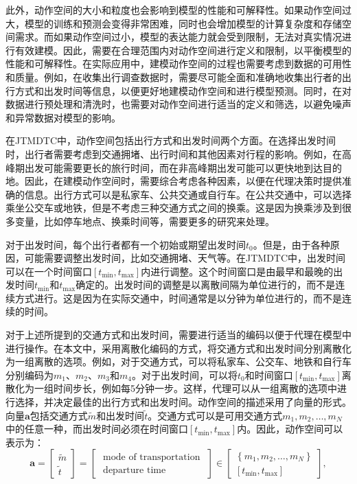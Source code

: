 此外，动作空间的大小和粒度也会影响到模型的性能和可解释性。如果动作空间过大，模型的训练和预测会变得非常困难，同时也会增加模型的计算复杂度和存储空间需求。而如果动作空间过小，模型的表达能力就会受到限制，无法对真实情况进行有效建模。因此，需要在合理范围内对动作空间进行定义和限制，以平衡模型的性能和可解释性。在实际应用中，建模动作空间的过程也需要考虑到数据的可用性和质量。例如，在收集出行调查数据时，需要尽可能全面和准确地收集出行者的出行方式和出发时间等信息，以便更好地建模动作空间和进行模型预测。同时，在对数据进行预处理和清洗时，也需要对动作空间进行适当的定义和筛选，以避免噪声和异常数据对模型的影响。

在JTMDTC中，动作空间包括出行方式和出发时间两个方面。在选择出发时间时，出行者需要考虑到交通拥堵、出行时间和其他因素对行程的影响。例如，在高峰期出发可能需要更长的旅行时间，而在非高峰期出发可能可以更快地到达目的地。因此，在建模动作空间时，需要综合考虑各种因素，以便在代理决策时提供准确的信息。出行方式可以是私家车、公共交通或自行车。在公共交通中，可以选择乘坐公交车或地铁，但是不考虑三种交通方式之间的换乘。这是因为换乘涉及到很多变量，比如停车地点、换乘时间等，需要更多的研究来处理。

对于出发时间，每个出行者都有一个初始或期望出发时间$t_0$。但是，由于各种原因，可能需要调整出发时间，比如交通拥堵、天气等。在JTMDTC中，出发时间可以在一个时间窗口$[t_{\min},t_{\max}]$内进行调整。这个时间窗口是由最早和最晚的出发时间$t_{\min}$和$t_{\max}$确定的。出发时间的调整是以离散间隔为单位进行的，而不是连续方式进行。这是因为在实际交通中，时间通常是以分钟为单位进行的，而不是连续的时间。

对于上述所提到的交通方式和出发时间，需要进行适当的编码以便于代理在模型中进行操作。在本文中，采用离散化编码的方式，将交通方式和出发时间分别离散化为一组离散的选项。例如，对于交通方式，可以将私家车、公交车、地铁和自行车分别编码为$m_1$、$m_2$、$m_3$和$m_4$。对于出发时间，可以将$t_0$和时间窗口$[t_{\min},t_{\max}]$离散化为一组时间步长，例如每5分钟一步。这样，代理可以从一组离散的选项中进行选择，并决定最佳的出行方式和出发时间。动作空间的描述采用了向量的形式。向量$\bm{a}$包括交通方式$\tilde{m}$和出发时间$\tilde{t}$。交通方式可以是可用交通方式$m_{1},m_{2}, \ldots, m_{N}$中的任意一种，而出发时间必须在时间窗口$[t_{\min }, t_{\max }]$内。因此，动作空间可以表示为：
\begin{equation}
\bm{a}=\left[\begin{array}{c}
\tilde{m} \\
\tilde{t}
\end{array}\right]=\left[\begin{array}{c}
\text { mode of transportation } \\
\text { departure time }
\end{array}\right]
\in\left[\begin{array}{c}
\left\{m_{1},m_{2}, \ldots, m_{N}\right\} \\
{\left[t_{\min }, t_{\max }\right]}
\end{array}\right],
\end{equation}


